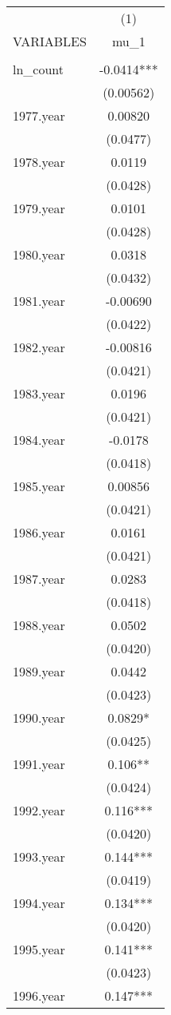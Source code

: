 \documentclass[]{article}
\begin{document}
\begin{tabular}{lc} \hline
 & (1) \\
VARIABLES & mu\_1 \\ \hline
 &  \\
ln\_count & -0.0414*** \\
 & (0.00562) \\
1977.year & 0.00820 \\
 & (0.0477) \\
1978.year & 0.0119 \\
 & (0.0428) \\
1979.year & 0.0101 \\
 & (0.0428) \\
1980.year & 0.0318 \\
 & (0.0432) \\
1981.year & -0.00690 \\
 & (0.0422) \\
1982.year & -0.00816 \\
 & (0.0421) \\
1983.year & 0.0196 \\
 & (0.0421) \\
1984.year & -0.0178 \\
 & (0.0418) \\
1985.year & 0.00856 \\
 & (0.0421) \\
1986.year & 0.0161 \\
 & (0.0421) \\
1987.year & 0.0283 \\
 & (0.0418) \\
1988.year & 0.0502 \\
 & (0.0420) \\
1989.year & 0.0442 \\
 & (0.0423) \\
1990.year & 0.0829* \\
 & (0.0425) \\
1991.year & 0.106** \\
 & (0.0424) \\
1992.year & 0.116*** \\
 & (0.0420) \\
1993.year & 0.144*** \\
 & (0.0419) \\
1994.year & 0.134*** \\
 & (0.0420) \\
1995.year & 0.141*** \\
 & (0.0423) \\
1996.year & 0.147*** \\

\end{tabular}
\end{document}
